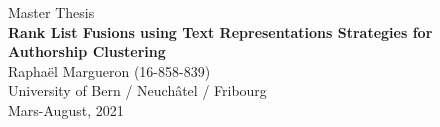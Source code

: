 \documentclass{article}
\theoremstyle{definition}
\begin{document}
\date{}
\author{Raphaël Margueron}

\begin{titlepage}
\vfill
\begin{center}
{\large Master Thesis}
\\[0.5cm]
{\LARGE \textbf{Rank List Fusions using Text Representations Strategies for Authorship Clustering}}
\\[2.5cm]
{\large Raphaël Margueron (16-858-839)}
\\[0.5cm]
{\large University of Bern / Neuchâtel / Fribourg}
\\[0.5cm]
{\large Mars-August, 2021}
\\[0.5cm]
\end{center}
\end{titlepage}

\onecolumn
{}

\vspace*{\fill}

\vspace*{\fill}
\clearpage

\tableofcontents
\clearpage

\listoftables
\clearpage

\listoffigures
\clearpage

\listoftheorems
\clearpage

\twocolumn
{}







\clearpage

\onecolumn
{}
\renewcommand{\thesubsection}{\Alph{subsection}}
\renewcommand{\thetable}{\alph{table}}
\renewcommand{\thefigure}{\alph{figure}}
\setcounter{subsection}{0}
\setcounter{table}{0}
\setcounter{figure}{0}


\clearpage

\end{document}
